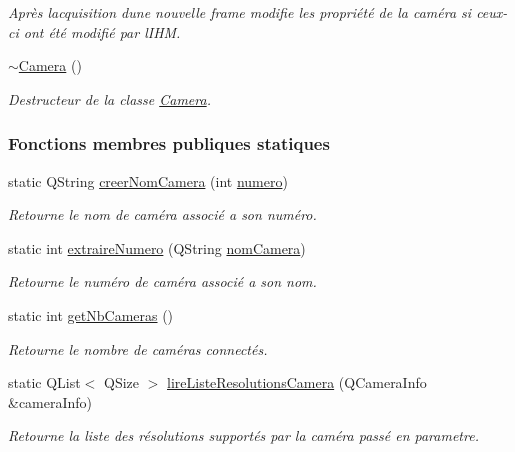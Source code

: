 \begin{DoxyCompactItemize}
\begin{DoxyCompactList}\small\item\em Après l\textquotesingle{}acquisition d\textquotesingle{}une nouvelle frame modifie les propriété de la caméra si ceux-\/ci ont été modifié par l\textquotesingle{}I\+HM. \end{DoxyCompactList}\item 
\hyperlink{class_camera_ad1897942d0ccf91052386388a497349f}{$\sim$\+Camera} ()
\begin{DoxyCompactList}\small\item\em Destructeur de la classe \hyperlink{class_camera}{Camera}. \end{DoxyCompactList}\end{DoxyCompactItemize}
\subsubsection*{Fonctions membres publiques statiques}
\begin{DoxyCompactItemize}
\item 
static Q\+String \hyperlink{class_camera_a506d459df95042a03894afd5b781c2aa}{creer\+Nom\+Camera} (int \hyperlink{class_camera_ae5cda5df3c9c49b88fff15389a1bbc64}{numero})
\begin{DoxyCompactList}\small\item\em Retourne le nom de caméra associé a son numéro. \end{DoxyCompactList}\item 
static int \hyperlink{class_camera_aa3fdc8b3feac7074911b472c4edb9dec}{extraire\+Numero} (Q\+String \hyperlink{class_camera_ac1cdaf82921d2a2f3f941d867718eba2}{nom\+Camera})
\begin{DoxyCompactList}\small\item\em Retourne le numéro de caméra associé a son nom. \end{DoxyCompactList}\item 
static int \hyperlink{class_camera_a116b3869ff0647c851715605a1938a3c}{get\+Nb\+Cameras} ()
\begin{DoxyCompactList}\small\item\em Retourne le nombre de caméras connectés. \end{DoxyCompactList}\item 
static Q\+List$<$ Q\+Size $>$ \hyperlink{class_camera_ac4756add4cb6bef60e38f3da79c2383f}{lire\+Liste\+Resolutions\+Camera} (Q\+Camera\+Info \&camera\+Info)
\begin{DoxyCompactList}\small\item\em Retourne la liste des résolutions supportés par la caméra passé en parametre. \end{DoxyCompactList}\end{DoxyCompactItemize}

